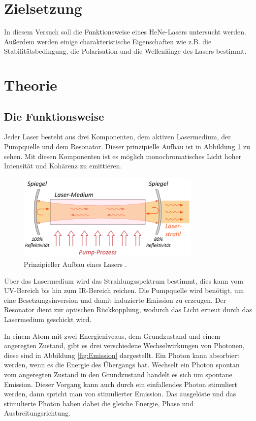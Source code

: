 \section{Zielsetzung}
In diesem Versuch soll die Funktionsweise eines HeNe-Lasers untersucht werden. Außerdem werden einige
charakteristische Eigenschaften wie z.B. die Stabilitätsbedingung, die Polarisation und die
Wellenlänge des Lasers bestimmt.

\section{Theorie}
\label{sec:Theorie}
\subsection{Die Funktionsweise}
Jeder Laser besteht aus drei Komponenten, dem aktiven Lasermedium, der Pumpquelle und dem
Resonator. Dieser prinzipielle Aufbau ist in Abbildung \ref{fig:aufbau} zu sehen.
Mit diesen Komponenten ist es möglich monochromatisches Licht hoher Intensität
und Kohärenz zu emittieren.

\begin{figure}[H]
  \centering
  \includegraphics[width=9cm]{Aufbau3.png}
  \caption{Prinzipieller Aufbau eines Lasers \cite{Laser}.}
  \label{fig:aufbau}
\end{figure}

Über das Lasermedium wird das Strahlungsspektrum bestimmt, dies kann vom UV-Bereich bis hin
zum IR-Bereich reichen. Die Pumpquelle wird benötigt, um eine Besetzungsinversion und damit
induzierte Emission zu erzeugen. Der Resonator dient zur optischen Rückkopplung, wodurch das
Licht erneut durch das Lasermedium geschickt wird.

In einem Atom mit zwei Energieniveaus, dem Grundzustand und einem angeregten Zustand, gibt es
drei verschiedene Wechselwirkungen von Photonen, diese sind in Abbildung \ref{fig:Emission} dargestellt.
Ein Photon kann absorbiert werden, wenn es die
Energie des Übergangs hat. Wechselt ein Photon spontan vom angeregten Zustand in den Grundzustand
handelt es sich um spontane Emission. Dieser Vorgang kann auch durch ein einfallendes Photon
stimuliert werden, dann spricht man von stimulierter Emission. Das ausgelöste und das stimulierte Photon
haben dabei die gleiche Energie, Phase und Ausbreitungsrichtung.

